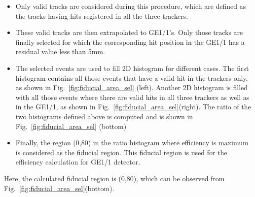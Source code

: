 \begin{itemize}
        \item Only valid tracks are considered during this procedure, which are defined as the tracks having hits registered in all the three trackers.
        \item These valid tracks are then extrapolated to GE1/1’s. Only those tracks are finally selected for which the corresponding hit position in the GE1/1 has a residual value less than 5mm.
        \item The selected events are used to fill 2D histogram for different cases. The first histogram contains all those events that have a valid hit in the trackers only, as shown in Fig.~\ref{fig:fiducial_area_sel} (left). Another 2D histogram is filled with all those events where there are valid hits in all three trackers as well as in the GE1/1, as shown in Fig.~\ref{fig:fiducial_area_sel}(right). The ratio of the two histograms defined above is computed and is shown in Fig.~\ref{fig:fiducial_area_sel} (bottom)
        \item Finally, the region (0,80) in the ratio histogram where efficiency is maximum is considered as the fiducial region. This fiducial region is used for the efficiency calculation for GE1/1 detector.
\end{itemize}
Here, the calculated fiducial region is (0,80), which can be observed from Fig.~\ref{fig:fiducial_area_sel}(bottom).
